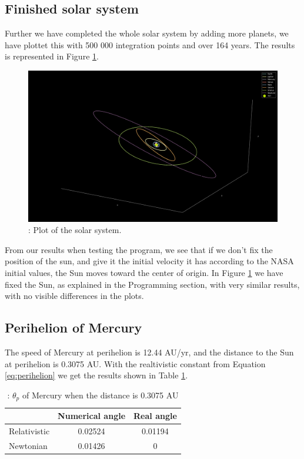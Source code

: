 \documentclass{article}
\begin{document}
\subsection{Finished solar system}
Further we have completed the whole solar system by adding more planets, we have plottet this with 500 000 integration points and over 164 years. The results is represented in Figure \ref{fig:solar}.

\begin{figure}[H]
    \begin{center}
        \includegraphics[width=1.2\textwidth]{./Plot/Solar_System.png}
        \caption{: Plot of the solar system.}
        \label{fig:solar}
    \end{center}
\end{figure}

From our results when testing the program, we see that if we don't fix the position of the sun, and give it the initial velocity it has according to the NASA initial values, the Sun moves toward the center of origin. In Figure \ref{fig:solar} we have fixed the Sun, as explained in the Programming section, with very similar results, with no visible differences in the plots.


\subsection{Perihelion of Mercury}
The speed of Mercury at perihelion is 12.44 AU/yr, and the distance to the Sun at perihelion is 0.3075 AU. With the realtivistic constant from Equation \ref{eq:perihelion} we get the results shown in Table \ref{tab:perihelion}.

\begin{table}[h!]
    \caption{: $\theta_p$ of Mercury when the distance is 0.3075 AU}
    \label{tab:perihelion}
    \centering
    \begin{tabular}{l c c}

              & Numerical angle & Real angle\\
        \hline
        Relativistic    & 0.02524 & 0.01194 \\
        Newtonian   & 0.01426  &  0 \\
        \hline
    \end{tabular}
\end{table}
\end{document}
